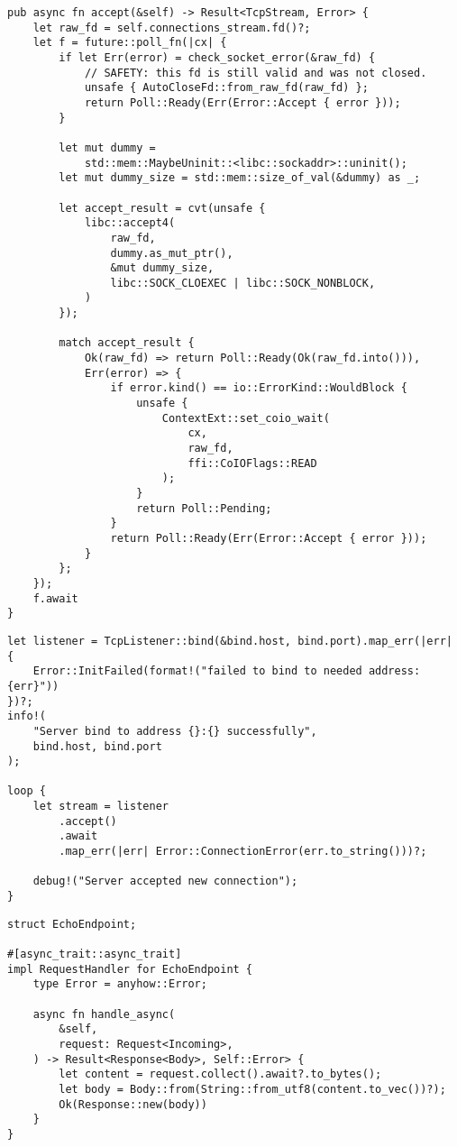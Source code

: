\documentclass[times,numbers=noenddot]{itmo-student-thesis}
\begin{document}
\begin{lstlisting}[float=!h,caption={Реализация ключевого метода accept},label={lst1}]
pub async fn accept(&self) -> Result<TcpStream, Error> {
    let raw_fd = self.connections_stream.fd()?;
    let f = future::poll_fn(|cx| {
        if let Err(error) = check_socket_error(&raw_fd) {
            // SAFETY: this fd is still valid and was not closed.
            unsafe { AutoCloseFd::from_raw_fd(raw_fd) };
            return Poll::Ready(Err(Error::Accept { error }));
        }

        let mut dummy =
            std::mem::MaybeUninit::<libc::sockaddr>::uninit();
        let mut dummy_size = std::mem::size_of_val(&dummy) as _;

        let accept_result = cvt(unsafe {
            libc::accept4(
                raw_fd,
                dummy.as_mut_ptr(),
                &mut dummy_size,
                libc::SOCK_CLOEXEC | libc::SOCK_NONBLOCK,
            )
        });

        match accept_result {
            Ok(raw_fd) => return Poll::Ready(Ok(raw_fd.into())),
            Err(error) => {
                if error.kind() == io::ErrorKind::WouldBlock {
                    unsafe {
                        ContextExt::set_coio_wait(
                            cx,
                            raw_fd,
                            ffi::CoIOFlags::READ
                        );
                    }
                    return Poll::Pending;
                }
                return Poll::Ready(Err(Error::Accept { error }));
            }
        };
    });
    f.await
}
\end{lstlisting}

\begin{lstlisting}[float=!h,caption={Главный цикл веб-сервера},label={lst2}]
let listener = TcpListener::bind(&bind.host, bind.port).map_err(|err| {
    Error::InitFailed(format!("failed to bind to needed address: {err}"))
})?;
info!(
    "Server bind to address {}:{} successfully",
    bind.host, bind.port
);

loop {
    let stream = listener
        .accept()
        .await
        .map_err(|err| Error::ConnectionError(err.to_string()))?;

    debug!("Server accepted new connection");
}
\end{lstlisting}

\begin{lstlisting}[float=!h,caption={Бизнес-логика тестового приложения},label={lst3}]
struct EchoEndpoint;

#[async_trait::async_trait]
impl RequestHandler for EchoEndpoint {
    type Error = anyhow::Error;

    async fn handle_async(
        &self,
        request: Request<Incoming>,
    ) -> Result<Response<Body>, Self::Error> {
        let content = request.collect().await?.to_bytes();
        let body = Body::from(String::from_utf8(content.to_vec())?);
        Ok(Response::new(body))
    }
}
\end{lstlisting}
\end{document}
